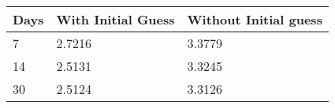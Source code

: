 \begin{tabular}{lll}
Days & With Initial Guess & Without Initial guess \\ 
\hline 
7 & 2.7216 & 3.3779 \\ 
14 & 2.5131 & 3.3245 \\ 
30 & 2.5124 & 3.3126 \\ 
\hline 
\end{tabular}